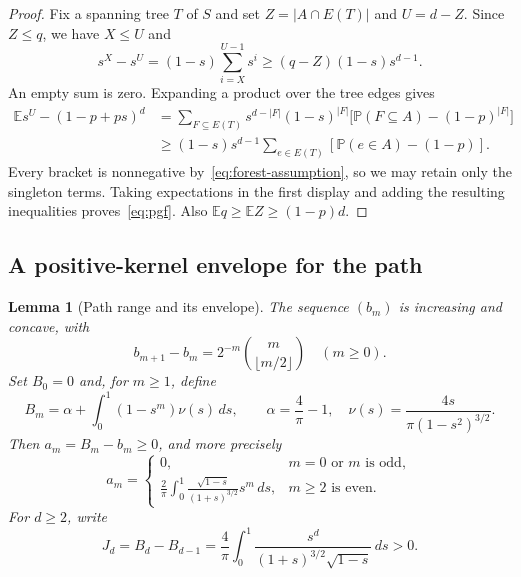 \documentclass[11pt,reqno]{amsart}
\newtheorem{lemma}[theorem]{Lemma}
\theoremstyle{remark}
\numberwithin{equation}{section}
\newcommand{\E}{\mathbb E}
\newcommand{\PP}{\mathbb P}
\begin{document}
\begin{proof}
Fix a spanning tree $T$ of $S$ and set $Z=|A\cap E(T)|$ and $U=d-Z$.
Since $Z\le q$, we have $X\le U$ and
\[
 s^X-s^U=(1-s)\sum_{i=X}^{U-1}s^i
          \ge(q-Z)(1-s)s^{d-1}.
\]
An empty sum is zero. Expanding a product over the tree edges gives
\begin{align*}
 \E s^U-(1-p+ps)^d
 &=\sum_{F\subseteq E(T)}s^{d-|F|}(1-s)^{|F|}
     \bigl[\PP(F\subseteq A)-(1-p)^{|F|}\bigr]\\
 &\ge (1-s)s^{d-1}
       \sum_{e\in E(T)}[\PP(e\in A)-(1-p)].
\end{align*}
Every bracket is nonnegative by~\eqref{eq:forest-assumption}, so we may
retain only the singleton terms. Taking expectations in the first
display and adding the resulting inequalities proves~\eqref{eq:pgf}.
Also $\E q\ge\E Z\ge(1-p)d$.
\end{proof}

\subsection{A positive-kernel envelope for the path}

\begin{lemma}[Path range and its envelope]\label{lem:envelope}
The sequence $(b_m)$ is increasing and concave, with
\begin{equation}\label{eq:path-increments}
 b_{m+1}-b_m=2^{-m}\binom{m}{\lfloor m/2\rfloor}\quad(m\ge0).
\end{equation}
Set $B_0=0$ and, for $m\ge1$, define
\begin{equation}\label{eq:envelope}
 B_m=\alpha+\int_0^1(1-s^m)\nu(s)\,ds,\qquad
 \alpha=\frac4\pi-1,\quad
 \nu(s)=\frac{4s}{\pi(1-s^2)^{3/2}}.
\end{equation}
Then $a_m=B_m-b_m\ge0$, and more precisely
\begin{equation}\label{eq:parity-error}
 a_m=
 \begin{cases}
 0,&m=0\text{ or }m\text{ is odd},\\[2pt]
 \displaystyle\frac2\pi\int_0^1
       \frac{\sqrt{1-s}}{(1+s)^{3/2}}s^m\,ds,
       &m\ge2\text{ is even}.
 \end{cases}
\end{equation}
For $d\ge2$, write
\begin{equation}\label{eq:J}
 J_d=B_d-B_{d-1}
     =\frac4\pi\int_0^1
       \frac{s^d}{(1+s)^{3/2}\sqrt{1-s}}\,ds>0.
\end{equation}
\end{lemma}
\end{document}
